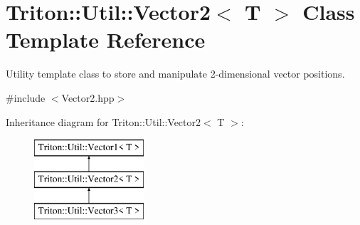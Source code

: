 \hypertarget{class_triton_1_1_util_1_1_vector2}{}\section{Triton\+:\+:Util\+:\+:Vector2$<$ T $>$ Class Template Reference}
\label{class_triton_1_1_util_1_1_vector2}


Utility template class to store and manipulate 2-\/dimensional vector positions.  




{\ttfamily \#include $<$Vector2.\+hpp$>$}

Inheritance diagram for Triton\+:\+:Util\+:\+:Vector2$<$ T $>$\+:\begin{figure}[H]
\begin{center}
\leavevmode
\includegraphics[height=3.000000cm]{class_triton_1_1_util_1_1_vector2}
\end{center}
\end{figure}
